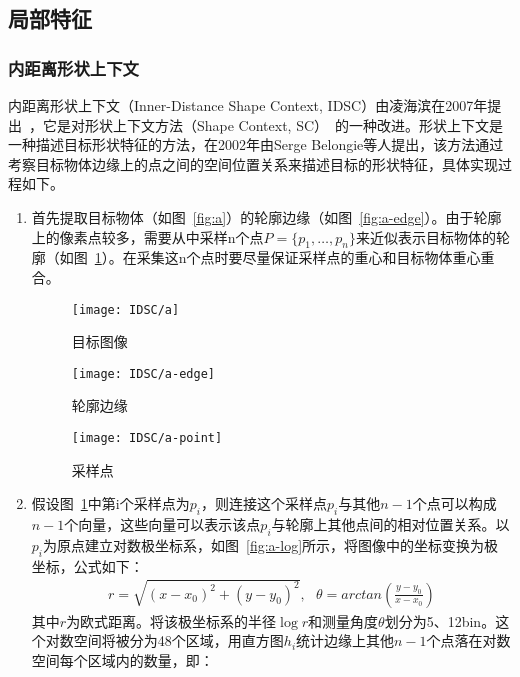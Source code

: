 \subsection{局部特征}

\subsubsection{内距离形状上下文}
\label{sec:onefig}

内距离形状上下文（Inner-Distance Shape Context, IDSC）由凌海滨在2007年提出~\cite{ling2007shape}，它是对形状上下文方法（Shape Context, SC）~\cite{belongie2002shape}的一种改进。形状上下文是一种描述目标形状特征的方法，在2002年由Serge Belongie等人提出，该方法通过考察目标物体边缘上的点之间的空间位置关系来描述目标的形状特征，具体实现过程如下。

\begin{enumerate}
\item 首先提取目标物体（如图~\ref{fig:a}）的轮廓边缘（如图~\ref{fig:a-edge}）。由于轮廓上的像素点较多，需要从中采样n个点$P=\{p_1,\dots,p_n\}$来近似表示目标物体的轮廓（如图~\ref{fig:a-point}）。在采集这n个点时要尽量保证采样点的重心和目标物体重心重合。
  \begin{figure}[H]
  \begin{minipage}{0.33\textwidth}
    \centering
    \texttt{[image: IDSC/a]}
    \caption{目标图像}
    \label{fig:a}
  \end{minipage}\hfill
  \begin{minipage}{0.33\textwidth}
    \centering
    \texttt{[image: IDSC/a-edge]}
    \caption{轮廓边缘}
    \label{fig:a-edge}
  \end{minipage}
  \begin{minipage}{0.33\textwidth}
    \centering
    \texttt{[image: IDSC/a-point]}
    \caption{采样点}
    \label{fig:a-point}
  \end{minipage}
  \end{figure}
\item 假设图~\ref{fig:a-point}中第i个采样点为$p_{i}$，则连接这个采样点$p_i$与其他$n-1$个点可以构成$n-1$个向量，这些向量可以表示该点$p_i$与轮廓上其他点间的相对位置关系。以$p_{i}$为原点建立对数极坐标系，如图~\ref{fig:a-log}所示，将图像中的坐标变换为极坐标，公式如下：
\begin{eqnarray}
r=\sqrt{(x-x_{0})^{2}+(y-y_{0})^{2}}, ~~~ \theta=arctan(\frac{y-y_{0}}{x-x_{0}})
\end{eqnarray}
其中$r$为欧式距离。将该极坐标系的半径$\log{r}$和测量角度$\theta$划分为5、12bin。这个对数空间将被分为48个区域，用直方图$h_{i}$统计边缘上其他$n-1$个点落在对数空间每个区域内的数量，即：

\end{enumerate}

